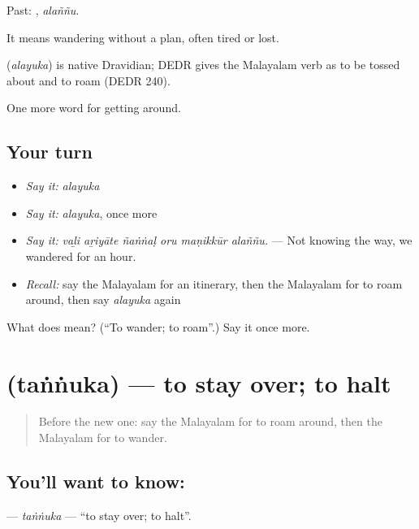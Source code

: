 Past: , \emph{alaññu}.

It means wandering without a plan, often tired or lost.

\begin{cousinweb}
\textbf{} (\emph{alayuka}) is native Dravidian; DEDR gives the Malayalam verb as to be tossed about and to roam (DEDR 240).
\end{cousinweb}

\begin{grammarlens}[title={What you've built}]
One more word for getting around.
\end{grammarlens}

\subsection*{Your turn}
\begin{itemize}
\raggedright
  \item \emph{Say it:} \emph{alayuka}
  \item \emph{Say it:} \emph{alayuka}, once more
  \item \emph{Say it:} \emph{vaḻi aṟiyāte ñaṅṅaḷ oru maṇikkūr alaññu.} — Not knowing the way, we wandered for an hour.
  \item \emph{Recall:} say the Malayalam for an itinerary, then the Malayalam for to roam around, then say \emph{alayuka} again
\end{itemize}

\begin{tcolorbox}[breakable,colback=teal!4,colframe=teal!35!black,title={Before you move on}]
What does  mean? (\textquotedblleft{}To wander; to roam\textquotedblright{}.) Say it once more.
\end{tcolorbox}
\section[\texorpdfstring{\ml{തങ്ങുക} (taṅṅuka)}{തങ്ങുക (taṅṅuka)}]{ (taṅṅuka) — to stay over; to halt}

\label{lesson:ML-C479-tannuka}



\begin{quote}
Before the new one: say the Malayalam for to roam around, then the Malayalam for to wander.
\end{quote}

\subsection*{You'll want to know: }
\textbf{} — \emph{taṅṅuka} — \textquotedblleft{}to stay over; to halt\textquotedblright{}.

